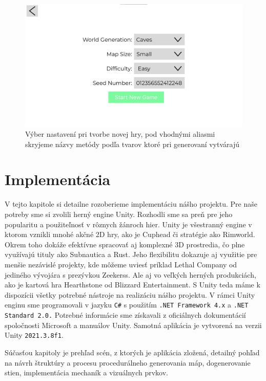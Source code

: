 \begin{figure}[H]
    \centering
    \includegraphics[width=0.8\linewidth]{obrazky-figures/screen2.png}
    \caption{Výber nastavení pri tvorbe novej hry, pod vhodnými aliasmi skryjeme názvy metódy podľa tvarov ktoré pri generovaní vytvárajú}
    \label{fig:screen-settings}
\end{figure}


\chapter{Implementácia} \label{sec:implementation}

V tejto kapitole si detailne rozoberieme implementáciu nášho projektu. Pre naše potreby sme si zvolili herný engine Unity. Rozhodli sme sa preň pre jeho popularitu a použiteľnosť v rôznych žánroch hier. Unity je všestranný engine v ktorom vznikli mnohé akčné 2D hry, ako je Cuphead či stratégie ako Rimworld. Okrem toho dokáže efektívne spracovať aj komplexné 3D prostredia, čo plne využívajú tituly ako Subnautica a Rust. Jeho flexibilitu dokazuje aj využitie pre menšie nezávislé projekty, kde môžeme uviesť príklad Lethal Company od jediného vývojára s prezývkou Zeekerss. Ale aj vo veľkých herných produkciách, ako je kartová hra Hearthstone od Blizzard Entertainment. S Unity teda máme k dispozícii všetky potrebné nástroje na realizáciu nášho projektu. V rámci Unity enginu sme programovali v jazyku \verb|C#| s použitím \verb|.NET Framework 4.x| a \verb|.NET Standard 2.0.| Potrebné informácie sme získavali z oficiálnych dokumentácií spoločnosti Microsoft a manuálov Unity. Samotná aplikácia je vytvorená na verzii Unity \verb|2021.3.8f1|.

Súčasťou kapitoly  je prehľad scén, z ktorých je aplikácia zložená, detailný pohľad na návrh štruktúry a procesu procedurálneho generovania máp, dogenerovanie stien, implementácia mechaník a vizuálnych prvkov. 


